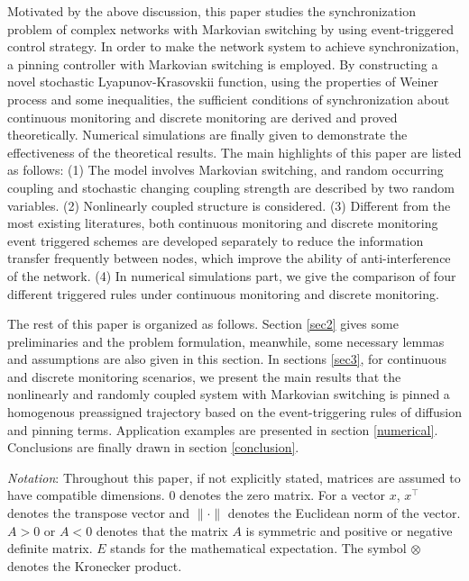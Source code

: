     Motivated by the above discussion, this paper studies the synchronization problem of complex networks with Markovian switching by using event-triggered control strategy. In order to make the network system to achieve synchronization, a pinning controller with Markovian switching is employed. By constructing a novel stochastic Lyapunov-Krasovskii function, using the properties of Weiner process and some inequalities, the sufficient conditions of synchronization about continuous monitoring and discrete monitoring are derived and proved theoretically. Numerical simulations are finally given to demonstrate the effectiveness of the theoretical results. The main highlights of this paper are listed as follows:
(1) The model involves Markovian switching, and random occurring coupling and stochastic changing coupling strength are described by two random variables. (2) Nonlinearly coupled structure is considered.
(3) Different from the most existing literatures\cite{uncertain-pro2,uncertain-pro5}, both continuous monitoring and discrete monitoring event triggered schemes are developed separately to reduce the information transfer frequently between nodes, which improve the ability of anti-interference of the network.
(4) In numerical simulations part, we give the comparison of four different triggered rules under continuous monitoring and discrete monitoring.

    The rest of this paper is organized as follows. Section \ref{sec2} gives some preliminaries and the problem formulation, meanwhile, some necessary lemmas and assumptions are also given in this section. In sections \ref{sec3}, for continuous and discrete  monitoring scenarios, we present the main results that the nonlinearly and randomly coupled system with Markovian switching is pinned a homogenous preassigned trajectory based on the event-triggering rules of diffusion and pinning terms. Application examples are presented in section \ref{numerical}. Conclusions are finally drawn in section \ref{conclusion}.

    \emph{Notation}: Throughout this paper, if not explicitly stated, matrices are assumed to have compatible dimensions. $0$ denotes the zero matrix. For a vector $x$, $x^\top$ denotes the transpose vector and $\|\cdot\|$ denotes the Euclidean norm of the vector. $A>0$ or $A<0$ denotes that the matrix $A$ is symmetric and positive or negative definite matrix. $E$ stands for the mathematical expectation. The symbol $\otimes$ denotes the Kronecker product. 